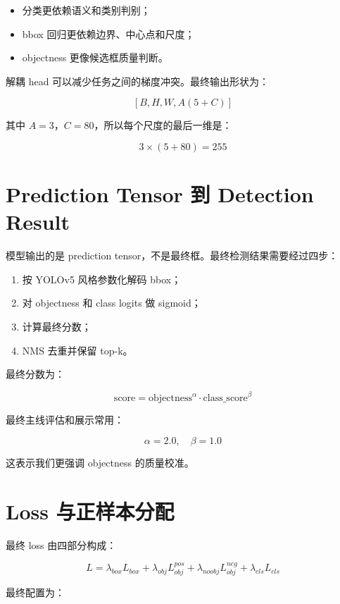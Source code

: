 \documentclass[11pt,a4paper]{article}
\begin{document}
\begin{itemize}
  \item 分类更依赖语义和类别判别；
  \item bbox 回归更依赖边界、中心点和尺度；
  \item objectness 更像候选框质量判断。
\end{itemize}

解耦 head 可以减少任务之间的梯度冲突。最终输出形状为：

\[
[B, H, W, A(5+C)]
\]

其中 $A=3$，$C=80$，所以每个尺度的最后一维是：

\[
3\times(5+80)=255
\]

\section{Prediction Tensor 到 Detection Result}

模型输出的是 prediction tensor，不是最终框。最终检测结果需要经过四步：

\begin{enumerate}[label=\arabic*.]
  \item 按 YOLOv5 风格参数化解码 bbox；
  \item 对 objectness 和 class logits 做 sigmoid；
  \item 计算最终分数；
  \item NMS 去重并保留 top-k。
\end{enumerate}

最终分数为：

\[
\text{score} = \text{objectness}^{\alpha} \cdot \text{class\_score}^{\beta}
\]

最终主线评估和展示常用：

\[
\alpha=2.0,\quad \beta=1.0
\]

这表示我们更强调 objectness 的质量校准。

\section{Loss 与正样本分配}

最终 loss 由四部分构成：

\[
L =
\lambda_{box} L_{box}
+ \lambda_{obj} L_{obj}^{pos}
+ \lambda_{noobj} L_{obj}^{neg}
+ \lambda_{cls} L_{cls}
\]

最终配置为：
\end{document}
